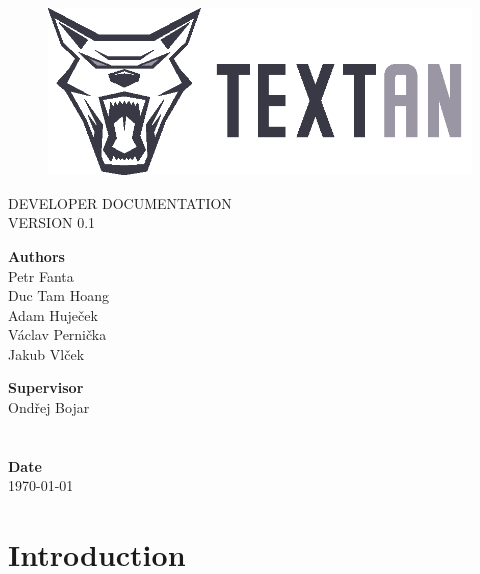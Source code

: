 \documentclass[12pt,a4paper]{report}
\begin{document}
\begin{titlepage}
\BgThispage
{}

\begin{figure}
 \includegraphics{../Logos/TEXTAN_logo_grey_B}
\end{figure}
\noindent
\textcolor{TextanRed}{\chapterfont\fontsize{48pt}{1pt}\selectfont\MakeUppercase{Developer documentation}}\\[15pt]
\textcolor{TextanDarkRed}{\sectionfont\LARGE\MakeUppercase{Version 0.1}}

\vfill
\noindent
\begin{minipage}[b]{.75\textwidth}
\textbf{Authors}\\
Petr Fanta\\
Duc Tam Hoang\\
Adam Huječek\\
Václav Pernička\\
Jakub Vlček
\end{minipage}%
\begin{minipage}[b]{.25\textwidth}
\textbf{Supervisor} \\
Ondřej Bojar\\
\\
\\
\textbf{Date}\\
\today
\end{minipage}

\end{titlepage}
\restoregeometry

\tableofcontents



\chapter{Introduction}
\end{document}
